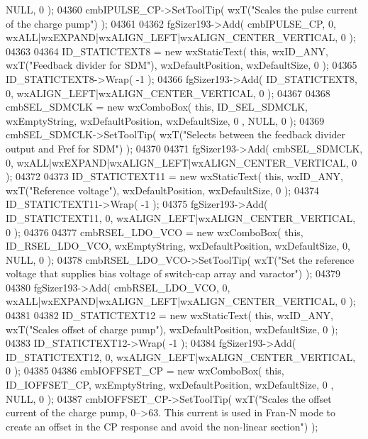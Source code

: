 \begin{DoxyCode}
      NULL, 0 ); 
04360     cmbIPULSE_CP->SetToolTip( wxT(\textcolor{stringliteral}{"Scales the pulse current of the charge pump"}) );
04361     
04362     fgSizer193->Add( cmbIPULSE_CP, 0, wxALL|wxEXPAND|wxALIGN\_LEFT|wxALIGN\_CENTER\_VERTICAL, 0 );
04363     
04364     ID_STATICTEXT8 = \textcolor{keyword}{new} wxStaticText( \textcolor{keyword}{this}, wxID\_ANY, wxT(\textcolor{stringliteral}{"Feedback divider for SDM"}), wxDefaultPosition, 
      wxDefaultSize, 0 );
04365     ID_STATICTEXT8->Wrap( -1 );
04366     fgSizer193->Add( ID_STATICTEXT8, 0, wxALIGN\_LEFT|wxALIGN\_CENTER\_VERTICAL, 0 );
04367     
04368     cmbSEL_SDMCLK = \textcolor{keyword}{new} wxComboBox( \textcolor{keyword}{this}, ID_SEL_SDMCLK, wxEmptyString, wxDefaultPosition, wxDefaultSize, 0
      , NULL, 0 ); 
04369     cmbSEL_SDMCLK->SetToolTip( wxT(\textcolor{stringliteral}{"Selects between the feedback divider output and Fref for SDM"}) );
04370     
04371     fgSizer193->Add( cmbSEL_SDMCLK, 0, wxALL|wxEXPAND|wxALIGN\_LEFT|wxALIGN\_CENTER\_VERTICAL, 0 );
04372     
04373     ID_STATICTEXT11 = \textcolor{keyword}{new} wxStaticText( \textcolor{keyword}{this}, wxID\_ANY, wxT(\textcolor{stringliteral}{"Reference voltage"}), wxDefaultPosition, 
      wxDefaultSize, 0 );
04374     ID_STATICTEXT11->Wrap( -1 );
04375     fgSizer193->Add( ID_STATICTEXT11, 0, wxALIGN\_LEFT|wxALIGN\_CENTER\_VERTICAL, 0 );
04376     
04377     cmbRSEL_LDO_VCO = \textcolor{keyword}{new} wxComboBox( \textcolor{keyword}{this}, ID_RSEL_LDO_VCO, wxEmptyString, wxDefaultPosition, 
      wxDefaultSize, 0, NULL, 0 ); 
04378     cmbRSEL_LDO_VCO->SetToolTip( wxT(\textcolor{stringliteral}{"Set the reference voltage that supplies bias voltage of switch-cap
       array and varactor"}) );
04379     
04380     fgSizer193->Add( cmbRSEL_LDO_VCO, 0, wxALL|wxEXPAND|wxALIGN\_LEFT|wxALIGN\_CENTER\_VERTICAL, 0 );
04381     
04382     ID_STATICTEXT12 = \textcolor{keyword}{new} wxStaticText( \textcolor{keyword}{this}, wxID\_ANY, wxT(\textcolor{stringliteral}{"Scales offset of charge pump"}), 
      wxDefaultPosition, wxDefaultSize, 0 );
04383     ID_STATICTEXT12->Wrap( -1 );
04384     fgSizer193->Add( ID_STATICTEXT12, 0, wxALIGN\_LEFT|wxALIGN\_CENTER\_VERTICAL, 0 );
04385     
04386     cmbIOFFSET_CP = \textcolor{keyword}{new} wxComboBox( \textcolor{keyword}{this}, ID_IOFFSET_CP, wxEmptyString, wxDefaultPosition, wxDefaultSize, 0
      , NULL, 0 ); 
04387     cmbIOFFSET_CP->SetToolTip( wxT(\textcolor{stringliteral}{"Scales the offset current of the charge pump, 0-->63. This current is
       used in Fran-N mode to create an offset in the CP response and avoid the non-linear section"}) );

\end{DoxyCode}
